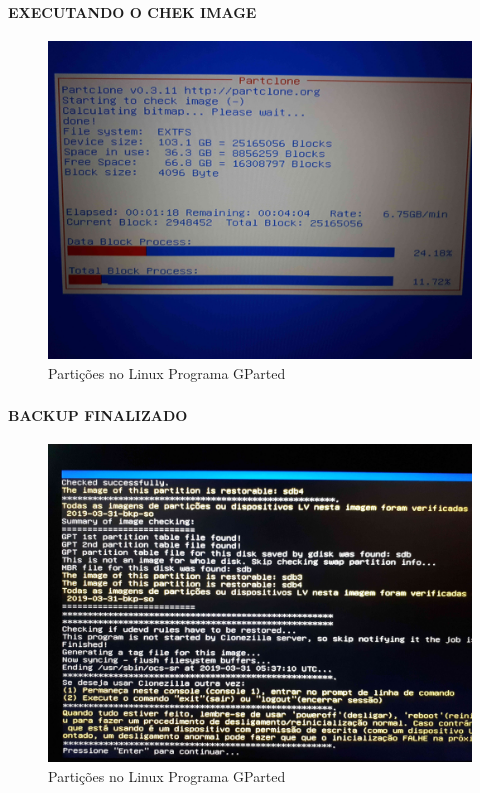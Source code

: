 \documentclass{beamer}
\begin{document}
\begin{frame}[plain,c]
   \frametitle{\insertsection}
    \framesubtitle{EXECUTANDO O CHEK IMAGE}
    \begin{figure}[!h]
        \includegraphics[width=1\linewidth]{images/backup/bkp30.jpg}
        \caption{Partições no Linux Programa GParted}
    \end{figure}
\end{frame}	


\begin{frame}[plain,c]
   \frametitle{\insertsection}
    \framesubtitle{BACKUP FINALIZADO}
    \begin{figure}[!h]
        \includegraphics[width=1\linewidth]{images/backup/bkp31.jpg}
        \caption{Partições no Linux Programa GParted}
    \end{figure}
\end{frame}	
\end{document}
